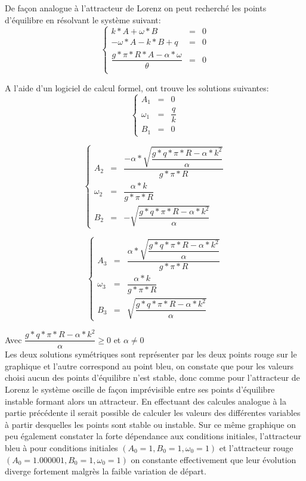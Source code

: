 De façon analogue à l'attracteur de Lorenz on peut recherché les points d'équilibre en résolvant le système suivant:
\[
    \left\{
    \begin{array}{rcl}
        k*A+\omega*B&=&0\\
        -\omega*A-k*B+q&=&0\\
        \dfrac{g*\pi*R*A-\alpha*\omega}{\theta }&=&0\\
    \end{array}
    \right.
\]

A l'aide d'un logiciel de calcul formel, ont trouve les solutions suivantes:
\[
    \left\{
    \begin{array}{rcl}
        A_1&=&0\\
        \omega_1&=&\dfrac{q}{k}\\
        B_1&=&0

    \end{array}
    \right.
\]

\[
    \left\{
    \begin{array}{rcl}
        A_2&=&\dfrac{-\alpha*\sqrt{\dfrac{g*q*\pi*R-\alpha*k^2}{\alpha}}}{g*\pi*R}\\
        \omega_2&=&\dfrac{\alpha*k}{g*\pi*R}\\
        B_2&=&-\sqrt{\dfrac{g*q*\pi*R-\alpha*k^2}{\alpha}}

    \end{array}
    \right.
\]

\[
    \left\{
    \begin{array}{rcl}
        A_3&=&\dfrac{\alpha*\sqrt{\dfrac{g*q*\pi*R-\alpha*k^2}{\alpha}}}{g*\pi*R}\\
        \omega_3&=&\dfrac{\alpha*k}{g*\pi*R}\\
        B_3&=&\sqrt{\dfrac{g*q*\pi*R-\alpha*k^2}{\alpha}}

    \end{array}
    \right.
\]

Avec $\dfrac{g*q*\pi*R-\alpha*k^2}{\alpha} \geq 0$ et $\alpha\neq 0$\\

Les deux solutions symétriques sont représenter par les deux points rouge sur le graphique et l'autre correspond au point bleu, on constate que pour les valeurs choisi aucun des points d'équilibre n'est stable, donc comme pour l'attracteur de Lorenz le système oscille de façon imprévisible entre ses points d'équilibre instable formant alors un attracteur. En effectuant des calcules analogue à la partie précédente il serait possible de calculer les valeurs des différentes variables à partir desquelles les points sont stable ou instable. 
Sur ce même graphique on peu également constater la forte dépendance aux conditions initiales, l'attracteur bleu à pour conditions initiales $(A_0=1,B_0=1,\omega_0=1)$ et l'attracteur rouge $(A_0=1.000001,B_0=1,\omega_0=1)$ on constante effectivement que leur évolution diverge fortement malgrès la faible variation de départ.



